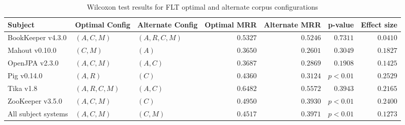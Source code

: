 
\begin{table}
\begin{spacing}{1.2}
\centering
\caption{Wilcoxon test results for FLT optimal and alternate corpus configurations}
\label{table:combo-flt-corpus-sweep-wilcox}
\begin{tabular}{lllrrrr}
\toprule
                      Subject &  Optimal Config & Alternate Config & Optimal MRR & Alternate MRR &  p-value & Effect size \\
\midrule
            BookKeeper v4.3.0 &     $(A, C, M)$ &   $(A, R, C, M)$ &    $0.5327$ &      $0.5246$ & $0.7311$ &    $0.0410$ \\
               Mahout v0.10.0 &        $(C, M)$ &            $(A)$ &    $0.3650$ &      $0.2601$ & $0.3049$ &    $0.1827$ \\
               OpenJPA v2.3.0 &     $(A, C, M)$ &         $(A, C)$ &    $0.3687$ &      $0.2869$ & $0.1908$ &    $0.1425$ \\
                  Pig v0.14.0 &        $(A, R)$ &            $(C)$ &    $0.4360$ &      $0.3124$ & $p<0.01$ &    $0.2529$ \\
                    Tika v1.8 &  $(A, R, C, M)$ &         $(A, C)$ &    $0.6482$ &      $0.5572$ & $0.3943$ &    $0.2165$ \\
             ZooKeeper v3.5.0 &     $(A, C, M)$ &            $(C)$ &    $0.4950$ &      $0.3930$ & $p<0.01$ &    $0.2400$ \\
 \midrule
All subject systems &     $(A, C, M)$ &         $(C, M)$ &    $0.4517$ &      $0.3971$ & $p<0.01$ &    $0.1273$ \\
\bottomrule
\end{tabular}

\end{spacing}
\end{table}

